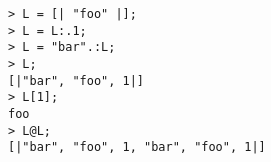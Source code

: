 \begin{center}\begin{minipage}{15cm}\begin{Verbatim}[frame=single]
> L = [| "foo" |];
> L = L:.1;
> L = "bar".:L;
> L;
[|"bar", "foo", 1|]
> L[1];
foo
> L@L;
[|"bar", "foo", 1, "bar", "foo", 1|]
\end{Verbatim}
\end{minipage}\end{center}
